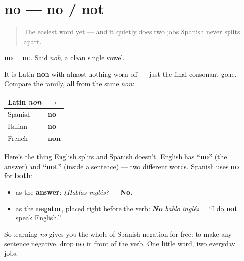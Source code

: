 \section[no]{no — no / not}

\label{lesson:ES-C19-no}



\begin{quote}
The easiest word yet — and it quietly does two jobs Spanish never splits apart.
\end{quote}

\begin{cousinweb}
\textbf{no} = \textbf{no}. Said \emph{noh}, a clean single vowel.

It is Latin \textbf{nōn} with almost nothing worn off — just the final consonant gone. Compare the family, all from the same \emph{nōn}:

\noindent
\begin{tabularx}{\linewidth}{@{}>{\raggedright\arraybackslash}X>{\raggedright\arraybackslash}X@{}}
\toprule
\textbf{Latin \emph{nōn}} & \textbf{$\to$} \\
\midrule
Spanish & \textbf{no} \\
Italian & \textbf{no} \\
French & \textbf{non} \\
\bottomrule
\end{tabularx}
\end{cousinweb}

\begin{grammarlens}[title={Grammar Lens: one word, two jobs}]
Here's the thing English splits and Spanish doesn't. English has \textbf{\textquotedblleft{}no\textquotedblright{}} (the answer) and \textbf{\textquotedblleft{}not\textquotedblright{}} (inside a sentence) — two different words. Spanish uses \textbf{no} for \textbf{both}:

\begin{itemize}
\raggedright
  \item as the \textbf{answer}: \emph{¿Hablas inglés?} — \textbf{No.}
  \item as the \textbf{negator}, placed right before the verb: \emph{\textbf{No} hablo inglés} = \textquotedblleft{}I do \textbf{not} speak English.\textquotedblright{}
\end{itemize}

So learning \emph{no} gives you the whole of Spanish negation for free: to make any sentence negative, drop \textbf{no} in front of the verb. One little word, two everyday jobs.
\end{grammarlens}


